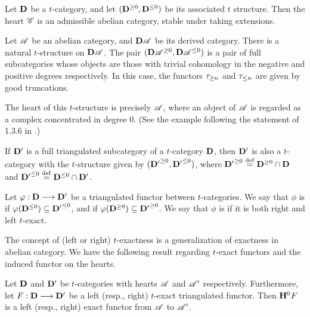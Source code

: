 \begin{thm}\label{thm_heart_is_abel_cat}
Let $\DCat$ be a $t$-category, and let $(\DCat^{\geq 0}, 
\DCat^{\leq 0})$ be its associated $t$ structure. Then the heart 
$\Cat{C}$ is an admissible abelian category, stable under
taking extensions. 
\end{thm}

\begin{ex}\label{ex_DA_t_struct}
Let $\Cat{A}$ be an abelian category, and $\DCat[D]\Cat{A}$ be its
derived category. There is a natural $t$-structure on 
$\DCat[D]\Cat{A}$. The pair $(\DCat[D]\Cat{A}^{\geq 0}, 
\DCat[D]\Cat{A}^{\leq 0})$ is a pair of full subcategories whose
objects are those with trivial cohomology in the negative and 
positive degrees respectively. In this case, the functors 
$\ggtrunc{n}$ and $\gltrunc{n}$ are given by good truncations. 

The heart of this $t$-structure is precisely $\Cat{A}$, where an
object of $\Cat{A}$ is regarded as a complex concentrated in degree
$0$. (See the example following the statement of 1.3.6 in \cite{BBD}.)
\end{ex}

\begin{ex}
If $\DCat'$ is a full triangulated subcategory of a $t$-category 
$\DCat$, then $\DCat'$ is also a $t$-category with the 
$t$-structure given by $({\DCat'}^{\geq 0}, {\DCat'}^{\leq 0})$, 
where ${\DCat'}^{\geq 0} \defeq \DCat^{\geq 0} \cap \DCat$ and 
${\DCat'}^{\leq 0} \defeq \DCat^{\leq 0} \cap \DCat'$. 
\end{ex}

\begin{defn}
Let $\phi: \DCat \to \DCat'$ be a triangulated functor between
$t$-categories. We say that $\phi$ is  if 
$\phi(\DCat^{\leq 0}) \subseteq {\DCat'}^{\leq 0}$, and  
 if $\phi(\DCat^{\geq 0}) \subseteq 
{\DCat'}^{\geq 0}$. We say that $\phi$ is  
if it is both right and left $t$-exact.
\end{defn}

The concept of (left or right) $t$-exactness is a generalization 
of exactness in abelian category. We have the following result
regarding $t$-exact functors and the induced functor on the
hearts.

\begin{prop}\label{prop_t_exact_implies_exact}
Let $\DCat$ and $\DCat'$ be $t$-categories with hearts 
$\Cat{A}$ and $\Cat{A}'$ respectively. Furthermore, let $F: 
\DCat \to \DCat'$ be a left (resp., right) $t$-exact triangulated 
functor. Then $\HH^0 F$ is a left (resp., right) exact 
functor from $\Cat{A}$ to $\Cat{A}'$.
\end{prop}

